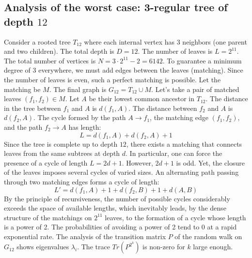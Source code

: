 \documentclass[12pt,a4paper]{article}
\begin{document}
\subsection{Analysis of the worst case: 3-regular tree of depth $12$}
Consider a rooted tree $T_{12}$ where each internal vertex has 3 neighbors (one parent and two children).
The total depth is $D = 12$.
The number of leaves is $L = 2^{11}$.
The total number of vertices is $N = 3 \cdot 2^{11} - 2 = 6142$.
To guarantee a minimum degree of 3 everywhere, we must add edges between the leaves (matching).
Since the number of leaves is even, such a perfect matching is possible.
Let the matching be $M$. The final graph is $G_{12} = T_{12} \cup M$.
Let's take a pair of matched leaves $(f_1, f_2) \in M$.
Let $A$ be their lowest common ancestor in $T_{12}$.
The distance in the tree between $f_1$ and $A$ is $d(f_1, A)$.
The distance between $f_2$ and $A$ is $d(f_2, A)$.
The cycle formed by the path $A \to f_1$, the matching edge $(f_1, f_2)$, and the path $f_2 \to A$ has length:
$$ L = d(f_1, A) + d(f_2, A) + 1 $$
Since the tree is complete up to depth $12$, there exists a matching that connects leaves from the same subtrees at depth $d$.
In particular, one can force the presence of a cycle of length $L = 2d + 1$. However, $2d+1$ is odd.
Yet, the closure of the leaves imposes several cycles of varied sizes. An alternating path passing through two matching edges forms a cycle of length:
$$ L' = d(f_1, A) + 1 + d(f_2, B) + 1 + d(A, B) $$
By the principle of recursiveness, the number of possible cycles considerably exceeds the space of available lengths, which inevitably leads, by the dense structure of the matchings on $2^{11}$ leaves, to the formation of a cycle whose length is a power of 2. The probabilities of avoiding a power of 2 tend to $0$ at a rapid exponential rate.
The analysis of the transition matrix $P$ of the random walk on $G_{12}$ shows eigenvalues $\lambda_i$. The trace $Tr(P^{2^k})$ is non-zero for $k$ large enough.
\end{document}
